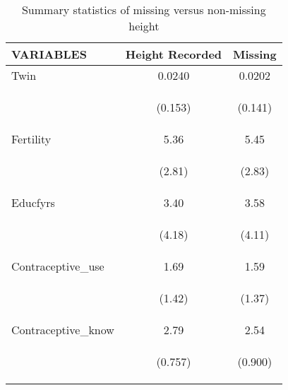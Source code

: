\documentclass{article}[11pt,subeqn]
\begin{document}
\begin{spacing}{1.25}
\begin{table}[ht]
\caption{Summary statistics of missing versus non-missing height}
\label{tab:missing}
\begin{center}
\begin{tabular}{lcc} \toprule
 VARIABLES & Height Recorded & Missing \\ \midrule
Twin & 0.0240 & 0.0202 \\
\begin{footnotesize}\end{footnotesize} & \begin{footnotesize}(0.153)\end{footnotesize} & \begin{footnotesize}(0.141)\end{footnotesize} \\
Fertility &  5.36 & 5.45\\
\begin{footnotesize}\end{footnotesize} & \begin{footnotesize}(2.81)\end{footnotesize} & \begin{footnotesize}(2.83)\end{footnotesize} \\
Educfyrs & 3.40 & 3.58\\
\begin{footnotesize}\end{footnotesize} & \begin{footnotesize}(4.18)\end{footnotesize} & \begin{footnotesize}(4.11)\end{footnotesize} \\
Contraceptive\_use &  1.69 &  1.59 \\
\begin{footnotesize}\end{footnotesize} & \begin{footnotesize}(1.42)\end{footnotesize} & \begin{footnotesize}(1.37)\end{footnotesize} \\
Contraceptive\_know &  2.79 & 2.54 \\
\begin{footnotesize}\end{footnotesize} & \begin{footnotesize}(0.757)\end{footnotesize} & \begin{footnotesize}(0.900)\end{footnotesize} \\

\end{tabular}
\end{center}
\end{table}
\end{spacing}
\end{document}
